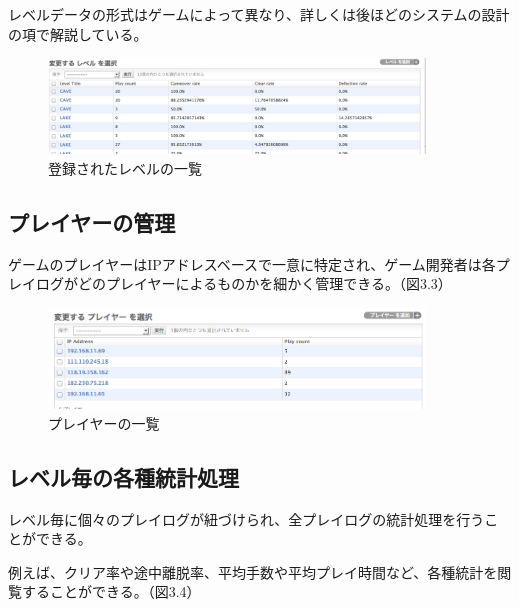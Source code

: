 レベルデータの形式はゲームによって異なり、詳しくは後ほどのシステムの設計の項で解説している。

\begin{figure}[htbp]
  \begin{center}
    \includegraphics[bb=0 0 1066 271, width=10cm]{images/levels.png}
  \end{center}
  \caption{登録されたレベルの一覧}
  \label{fig:one}
\end{figure}

\subsection{プレイヤーの管理}
ゲームのプレイヤーはIPアドレスベースで一意に特定され、ゲーム開発者は各プレイログがどのプレイヤーによるものかを細かく管理できる。（図3.3）

\begin{figure}[htbp]
  \begin{center}
    \includegraphics[bb=0 0 875 235, width=10cm]{images/players.png}
  \end{center}
  \caption{プレイヤーの一覧}
  \label{fig:one}
\end{figure}

\subsection{レベル毎の各種統計処理}
レベル毎に個々のプレイログが紐づけられ、全プレイログの統計処理を行うことができる。

例えば、クリア率や途中離脱率、平均手数や平均プレイ時間など、各種統計を閲覧することができる。（図3.4）

